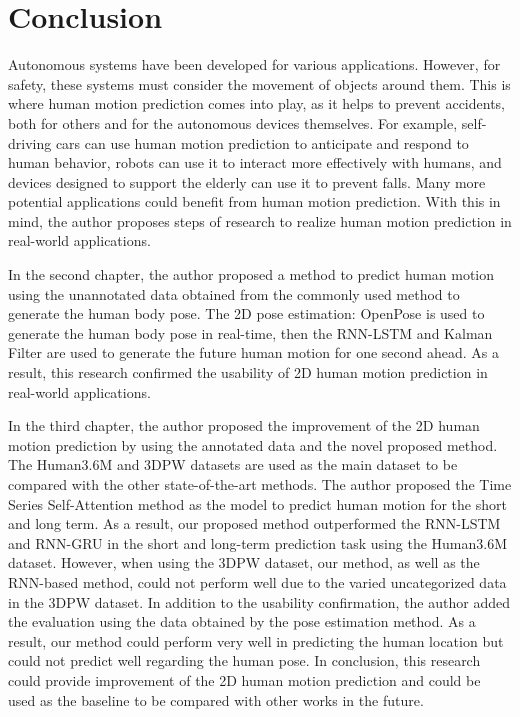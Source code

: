 
\chapter{Conclusion}\label{5} %
Autonomous systems have been developed for various applications. However, for safety, these systems must consider the movement of objects around them. This is where human motion prediction comes into play, as it helps to prevent accidents, both for others and for the autonomous devices themselves. For example, self-driving cars can use human motion prediction to anticipate and respond to human behavior, robots can use it to interact more effectively with humans, and devices designed to support the elderly can use it to prevent falls. Many more potential applications could benefit from human motion prediction.  With this in mind, the author proposes steps of research to realize human motion prediction in real-world applications.

In the second chapter, the author proposed a method to predict human motion using the unannotated data obtained from the commonly used method to generate the human body pose. The 2D pose estimation: OpenPose is used to generate the human body pose in real-time, then the RNN-LSTM and Kalman Filter are used to generate the future human motion for one second ahead. As a result, this research confirmed the usability of 2D human motion prediction in real-world applications. 

In the third chapter, the author proposed the improvement of the 2D human motion prediction by using the annotated data and the novel proposed method. The Human3.6M and 3DPW datasets are used as the main dataset to be compared with the other state-of-the-art methods. The author proposed the Time Series Self-Attention method as the model to predict human motion for the short and long term. As a result, our proposed method outperformed the RNN-LSTM and RNN-GRU in the short and long-term prediction task using the Human3.6M dataset. However, when using the 3DPW dataset, our method, as well as the RNN-based method, could not perform well due to the varied uncategorized data in the 3DPW dataset. In addition to the usability confirmation, the author added the evaluation using the data obtained by the pose estimation method. As a result, our method could perform very well in predicting the human location but could not predict well regarding the human pose. In conclusion, this research could provide improvement of the 2D human motion prediction and could be used as the baseline to be compared with other works in the future.

